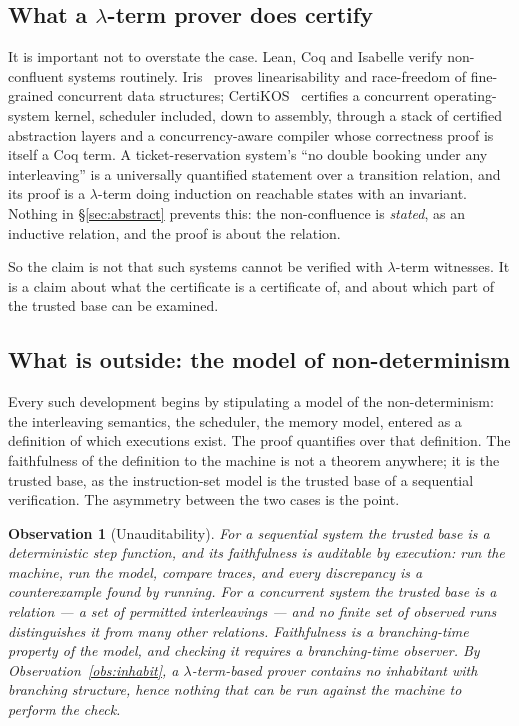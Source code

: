 \documentclass[11pt]{article}
\theoremstyle{plain}
\newtheorem{observation}[theorem]{Observation}
\theoremstyle{definition}
\theoremstyle{remark}
\begin{document}
\subsection{What a $\lambda$-term prover does certify}

It is important not to overstate the case. Lean, Coq and Isabelle verify
non-confluent systems routinely. Iris~\cite{Iris} proves linearisability and
race-freedom of fine-grained concurrent data structures; CertiKOS~\cite{CertiKOS}
certifies a concurrent operating-system kernel, scheduler included, down to
assembly, through a stack of certified abstraction layers and a
concurrency-aware compiler whose correctness proof is itself a Coq term. A
ticket-reservation system's ``no double booking under any interleaving'' is a
universally quantified statement over a transition relation, and its proof is a
$\lambda$-term doing induction on reachable states with an invariant. Nothing
in \S\ref{sec:abstract} prevents this: the non-confluence is \emph{stated},
as an inductive relation, and the proof is about the relation.

So the claim is not that such systems cannot be verified with $\lambda$-term
witnesses. It is a claim about what the certificate is a certificate of, and
about which part of the trusted base can be examined.

\subsection{What is outside: the model of non-determinism}

Every such development begins by stipulating a model of the non-determinism:
the interleaving semantics, the scheduler, the memory model, entered as a
definition of which executions exist. The proof quantifies over that
definition. The faithfulness of the definition to the machine is not a theorem
anywhere; it is the trusted base, as the instruction-set model is the trusted
base of a sequential verification. The asymmetry between the two cases is the
point.

\begin{observation}[Unauditability]\label{obs:audit}
For a sequential system the trusted base is a deterministic step function, and
its faithfulness is auditable by execution: run the machine, run the model,
compare traces, and every discrepancy is a counterexample found by running.
For a concurrent system the trusted base is a relation --- a set of permitted
interleavings --- and no finite set of observed runs distinguishes it from
many other relations. Faithfulness is a branching-time property of the model,
and checking it requires a branching-time observer. By
Observation~\ref{obs:inhabit}, a $\lambda$-term-based prover contains no
inhabitant with branching structure, hence nothing that can be run against the
machine to perform the check.
\end{observation}
\end{document}
